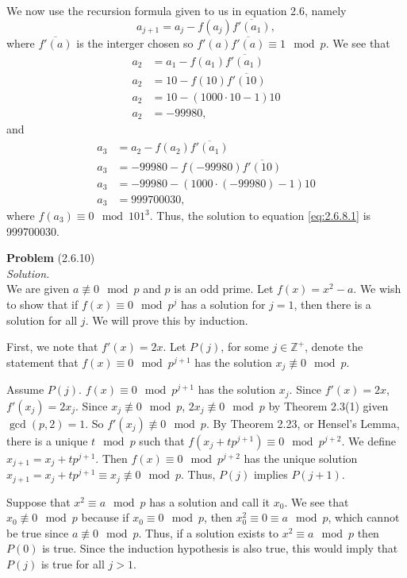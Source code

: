 \documentclass[12 pt]{amsart}
\begin{document}
  We now use the recursion formula given to us in equation 2.6, namely
  \[
    a_{j+1} = a_j - f(a_j) \overline{f'(a_1)},
  \]
  where $\overline{f'(a)}$ is the interger chosen so 
  $f'(a)\overline{f'(a)} \equiv 1 \mod p$.
  We see that 
  \begin{align*}
    a_2 &= a_1 - f(a_1) \overline{f'(a_1)} \\
    a_2 &= 10 - f(10) \overline{f'(10)} \\
    a_2 &= 10 - (1000 \cdot 10 - 1) 10 \\
    a_2 &= -99980,
  \end{align*}
  and 
  \begin{align*}
    a_3 &= a_2 - f(a_2) \overline{f'(a_1)} \\
    a_3 &= -99980 - f(-99980) \overline{f'(10)} \\
    a_3 &= -99980 - (1000 \cdot (-99980)- 1) 10 \\
    a_3 &= 999700030,
  \end{align*}
  where $f(a_3) \equiv 0 \mod 101^3$.
  Thus, the solution to equation \ref{eq:2.6.8.1} is 999700030.


\vfill
\newpage



\phantom{\quad} \vfill
\noindent
\textbf{Problem} (2.6.10) \\[4ex]
\emph{Solution.} \\[2ex]
  We are given $a \not \equiv 0 \mod p$ and $p$ is an odd prime.
  Let $f(x) = x^2 - a$.
  We wish to show that if $f(x) \equiv 0 \mod p^j$ has a solution
  for $j = 1$, then there is a solution for all $j$.
  We will prove this by induction.

  First, we note that $f'(x) = 2x$. 
  Let $P(j)$, for some $j \in \mathbb{Z}^+$, denote the statement
  that $f(x) \equiv 0 \mod p^{j+1}$ has the solution 
  $x_j \not \equiv 0 \mod p$. 

  Assume $P(j)$. 
  $f(x) \equiv 0 \mod p^{j+1}$ has the solution $x_j$. 
  Since $f'(x) = 2x$, $f'(x_j) = 2x_j$. 
  Since $x_j \not \equiv 0 \mod p$, 
  $2x_j \not \equiv 0 \mod p$ by Theorem 2.3(1) given 
  $\gcd(p, 2) = 1$.
  So $f'(x_j) \not \equiv 0 \mod p$.
  By Theorem 2.23, or Hensel's Lemma, 
  there is a unique $t \mod p$ such that 
  $f(x_j + tp^{j+1}) \equiv 0 \mod p^{j+2}$.
  We define $x_{j+1} = x_j + t p^{j+1}$.
  Then $f(x) \equiv 0 \mod p^{j+2}$ has the unique solution
  $x_{j+1} = x_j + t p^{j+1} \equiv x_j \not \equiv 0 \mod p$.
  Thus, $P(j)$ implies $P(j+1)$.

  Suppose that $x^2 \equiv a \mod p$ has a solution and call it
  $x_0$.
  We see that $x_0 \not \equiv 0 \mod p$ because if
  $x_0 \equiv 0 \mod p$, then
  $x_0^2 \equiv 0 \equiv a \mod p$, which cannot be true since
  $a \not \equiv 0 \mod p$.
  Thus, if a solution exists to $x^2 \equiv a \mod p$ then
  $P(0)$ is true. 
  Since the induction hypothesis is also true, 
  this would imply that $P(j)$ is true for all $j > 1$.
\vfill
\end{document}
